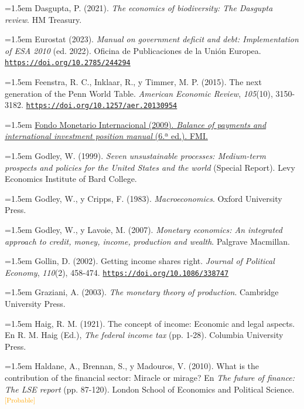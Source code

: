 \documentclass[10pt,a4paper]{article}
\begin{document}
\noindent\hangindent=1.5em Dasgupta, P. (2021). \textit{The economics of biodiversity: The Dasgupta review}. HM Treasury.

\noindent\hangindent=1.5em Eurostat (2023). \textit{Manual on government deficit and debt: Implementation of ESA 2010} (ed. 2022). Oficina de Publicaciones de la Unión Europea. \href{https://doi.org/10.2785/244294}{\nolinkurl{https://doi.org/10.2785/244294}}

\noindent\hangindent=1.5em Feenstra, R. C., Inklaar, R., y Timmer, M. P. (2015). The next generation of the Penn World Table. \textit{American Economic Review}, \textit{105}(10), 3150-3182. \href{https://doi.org/10.1257/aer.20130954}{\nolinkurl{https://doi.org/10.1257/aer.20130954}}

\noindent\hangindent=1.5em \href{https://www.imf.org/external/pubs/ft/bop/2007/pdf/bpm6.pdf}{Fondo Monetario Internacional (2009). \textit{Balance of payments and international investment position manual} (6.ª ed.). FMI.}

\noindent\hangindent=1.5em Godley, W. (1999). \textit{Seven unsustainable processes: Medium-term prospects and policies for the United States and the world} (Special Report). Levy Economics Institute of Bard College.

\noindent\hangindent=1.5em Godley, W., y Cripps, F. (1983). \textit{Macroeconomics}. Oxford University Press.

\noindent\hangindent=1.5em Godley, W., y Lavoie, M. (2007). \textit{Monetary economics: An integrated approach to credit, money, income, production and wealth}. Palgrave Macmillan.

\noindent\hangindent=1.5em Gollin, D. (2002). Getting income shares right. \textit{Journal of Political Economy}, \textit{110}(2), 458-474. \href{https://doi.org/10.1086/338747}{\nolinkurl{https://doi.org/10.1086/338747}}

\noindent\hangindent=1.5em Graziani, A. (2003). \textit{The monetary theory of production}. Cambridge University Press.

\noindent\hangindent=1.5em Haig, R. M. (1921). The concept of income: Economic and legal aspects. En R. M. Haig (Ed.), \textit{The federal income tax} (pp. 1-28). Columbia University Press.

\noindent\hangindent=1.5em Haldane, A., Brennan, S., y Madouros, V. (2010). What is the contribution of the financial sector: Miracle or mirage? En \textit{The future of finance: The LSE report} (pp. 87-120). London School of Economics and Political Science.\textcolor{orange}{\textsuperscript{[Probable]}}
\end{document}
